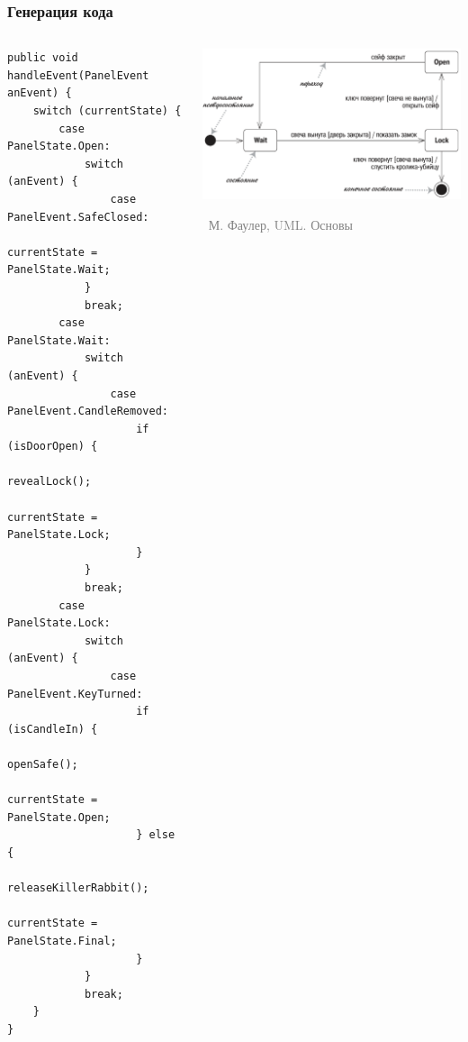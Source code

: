 \documentclass[xetex,mathserif,serif]{beamer}
\newcommand{\attribution}[1] {
	\vspace{-5mm}\begin{flushright}\begin{scriptsize}\textcolor{gray}{\textcopyright\, #1}\end{scriptsize}\end{flushright}
}
\begin{document}
	\begin{frame}[fragile]
		\frametitle{Генерация кода}
		\begin{columns}
			\begin{column}{0.5\textwidth}
				\begin{tiny}
					\begin{verbatim}
public void handleEvent(PanelEvent anEvent) {
    switch (currentState) {
        case PanelState.Open:
            switch (anEvent) {
                case PanelEvent.SafeClosed:
                    currentState = PanelState.Wait;
            }
            break;
        case PanelState.Wait:
            switch (anEvent) {
                case PanelEvent.CandleRemoved:
                    if (isDoorOpen) {
                        revealLock();
                        currentState = PanelState.Lock;
                    }
            }
            break;
        case PanelState.Lock:
            switch (anEvent) {
                case PanelEvent.KeyTurned:
                    if (isCandleIn) {
                        openSafe();
                        currentState = PanelState.Open;
                    } else {
                        releaseKillerRabbit();
                        currentState = PanelState.Final;
                    }
            }
            break;
    }
}
					\end{verbatim}
				\end{tiny}
			\end{column}
			\begin{column}{0.5\textwidth}
				\begin{center}
					\includegraphics[width=\textwidth]{stateTransitionSyntax.png}
					\attribution{М. Фаулер, UML. Основы}
				\end{center}
			\end{column}
		\end{columns}
	\end{frame}
\end{document}
